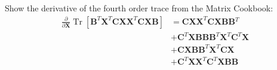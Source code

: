 \begin{exercise}
   Show the derivative of the fourth order trace from the Matrix Cookbook:
   \begin{align*}
\frac{\partial}{\partial \mathbf{X}} \operatorname{Tr}\left[\mathbf{B}^T \mathbf{X}^T \mathbf{C X} \mathbf{X}^T \mathbf{C X B}\right]&= \mathbf{C X} \mathbf{X}^T \mathbf{C X B B}{ }^T \\
& +\mathbf{C}^T \mathbf{X B B} \mathbf{B}^T \mathbf{X}^T \mathbf{C}^T \mathbf{X} \\
& +\mathbf{C X B B}^T \mathbf{X}^T \mathbf{C X} \\
& +\mathbf{C}^T \mathbf{X X}^T \mathbf{C}^T \mathbf{X} \mathbf{B B}
   \end{align*}
\end{exercise}
